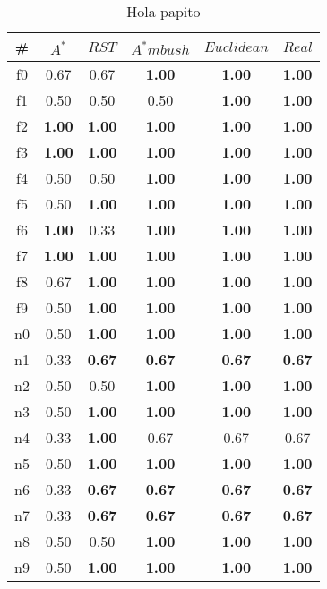 \begin{table}[h]
\caption{Hola papito}
\begin{center}

\begin{tabular}{|c|c|c|c|c|c|}
\hline
\# & $A^*$ & $RST$ & $A^*mbush$ & $Euclidean$ & $Real$\\
\hline
 f0 & 0.67 & 0.67 & \textbf{1.00} & \textbf{1.00} & \textbf{1.00}\\
f1 & 0.50 & 0.50 & 0.50 & \textbf{1.00} & \textbf{1.00}\\
f2 & \textbf{1.00} & \textbf{1.00} & \textbf{1.00} & \textbf{1.00} & \textbf{1.00}\\
f3 & \textbf{1.00} & \textbf{1.00} & \textbf{1.00} & \textbf{1.00} & \textbf{1.00}\\
f4 & 0.50 & 0.50 & \textbf{1.00} & \textbf{1.00} & \textbf{1.00}\\
f5 & 0.50 & \textbf{1.00} & \textbf{1.00} & \textbf{1.00} & \textbf{1.00}\\
f6 & \textbf{1.00} & 0.33 & \textbf{1.00} & \textbf{1.00} & \textbf{1.00}\\
f7 & \textbf{1.00} & \textbf{1.00} & \textbf{1.00} & \textbf{1.00} & \textbf{1.00}\\
f8 & 0.67 & \textbf{1.00} & \textbf{1.00} & \textbf{1.00} & \textbf{1.00}\\
f9 & 0.50 & \textbf{1.00} & \textbf{1.00} & \textbf{1.00} & \textbf{1.00}\\
\hline
n0 & 0.50 & \textbf{1.00} & \textbf{1.00} & \textbf{1.00} & \textbf{1.00}\\
n1 & 0.33 & \textbf{0.67} & \textbf{0.67} & \textbf{0.67} & \textbf{0.67}\\
n2 & 0.50 & 0.50 & \textbf{1.00} & \textbf{1.00} & \textbf{1.00}\\
n3 & 0.50 & \textbf{1.00} & \textbf{1.00} & \textbf{1.00} & \textbf{1.00}\\
n4 & 0.33 & \textbf{1.00} & 0.67 & 0.67 & 0.67\\
n5 & 0.50 & \textbf{1.00} & \textbf{1.00} & \textbf{1.00} & \textbf{1.00}\\
n6 & 0.33 & \textbf{0.67} & \textbf{0.67} & \textbf{0.67} & \textbf{0.67}\\
n7 & 0.33 & \textbf{0.67} & \textbf{0.67} & \textbf{0.67} & \textbf{0.67}\\
n8 & 0.50 & 0.50 & \textbf{1.00} & \textbf{1.00} & \textbf{1.00}\\
n9 & 0.50 & \textbf{1.00} & \textbf{1.00} & \textbf{1.00} & \textbf{1.00}\\
\hline
\end{tabular}

\label{ambushrate}
\end{center}
\end{table}
